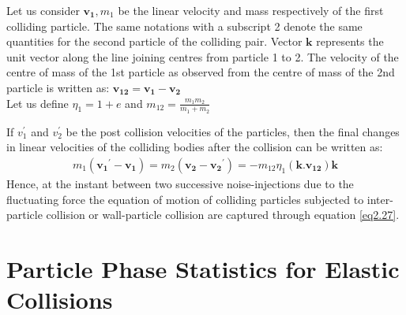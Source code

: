\documentclass[notitlepage]{revtex4-1}
\begin{document}
Let us  consider  $\mathbf{v_1},m_1$  be the linear velocity and mass respectively of the first colliding particle. The same notations with a subscript 2 denote the same quantities for the second particle of the colliding pair. Vector $\mathbf{k}$ represents the unit vector along the line joining centres from particle 1 to 2. The velocity of the centre of mass of the 1st particle as observed from the centre of mass of the 2nd particle is written as:
\begin{math}
\mathbf{v_{12}}=\mathbf{v_{1}}-\mathbf{v_{2}}
\end{math}
\\Let us define $\eta_1=1+e$ and $m_{12}=\frac{m_1m_2}{m_1+m_2}$

If $v_1^{'}$ and $v_2^{'}$ be the post collision velocities of the particles, then the final changes in linear velocities of the colliding bodies after the collision can be written as:
\begin{align}
	\label{eq2.27}
	m_1(\mathbf{v_1}^{'}-\mathbf{v_1})=m_2(\mathbf{v_2}-\mathbf{v_2}^{'})=-m_{12}\eta_1(\mathbf{k}.\mathbf{v_{12}})\mathbf{k}
\end{align}
Hence, at the instant between two successive noise-injections due to the fluctuating force the equation of motion of colliding particles subjected to inter-particle collision or wall-particle collision are captured through equation \ref{eq2.27}.
\section{Particle Phase Statistics for Elastic Collisions}
\label{sec:Particle Phase Statistics ideal}
\end{document}
